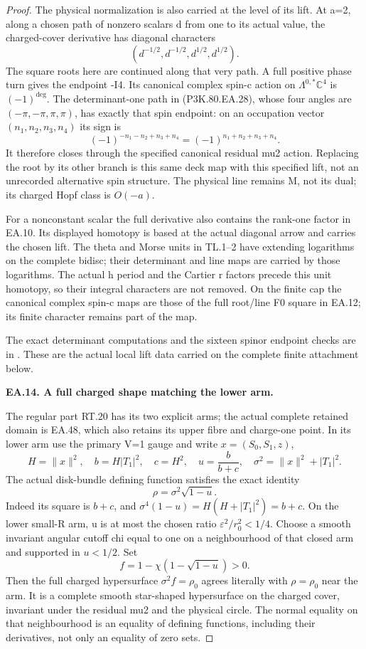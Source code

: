 \begin{proof}
The physical normalization is also carried at the level of its
lift. At a=2, along a chosen path of nonzero scalars d from one
to its actual value, the charged-cover derivative has diagonal
characters
\[
 (d^{-1/2},d^{-1/2},d^{1/2},d^{1/2}).
 \tag{P3K.80.EA.28}
\]
The square roots here are continued along that very path. A full
positive phase turn gives the endpoint -I4. Its canonical complex
spin-c action on \(\Lambda^{0,*}\mathbb C^4\) is
\((-1)^{\deg}\). The determinant-one path in (P3K.80.EA.28), whose
four angles are \((-\pi,-\pi,\pi,\pi)\), has exactly that
spin endpoint: on an occupation vector \((n_1,n_2,n_3,n_4)\)
its sign is
\[
 (-1)^{-n_1-n_2+n_3+n_4}=(-1)^{n_1+n_2+n_3+n_4}.
\]
It therefore closes through the specified canonical residual mu2
action. Replacing the root by its other branch is this same deck
map with this specified lift, not an unrecorded alternative spin
structure. The physical line remains M, not its dual; its charged
Hopf class is \(O(-a)\).

For a nonconstant scalar the full derivative also contains the
rank-one factor in EA.10. Its displayed homotopy is based at the
actual diagonal arrow and carries the chosen lift. The theta and
Morse units in TL.1--2 have extending logarithms on the complete
bidisc; their determinant and line maps are carried by those
logarithms. The actual h period and the Cartier r factors precede
this unit homotopy, so their integral characters are not removed.
On the finite cap the canonical complex spin-c maps are those of
the full root/line F0 square in EA.12; its finite character remains
part of the map.

The exact determinant computations and the sixteen spinor endpoint
checks are in .
These are the actual local lift data carried on the complete finite attachment below.

\par\medskip\noindent\textbf{EA.14. A full charged shape matching the lower arm.}\par\nopagebreak[4]

The regular part RT.20 has its two explicit arms; the actual complete retained domain is EA.48, which also retains its upper fibre and charge-one point. In its lower arm use the primary V=1 gauge and write
\(x=(S_0,S_1,z)\),
\[
 H=\|x\|^2,\quad b=H|T_1|^2,\quad c=H^2,
 \quad u=\frac b{b+c},\quad
 \sigma^2=\|x\|^2+|T_1|^2.
\]
The actual disk-bundle defining function satisfies the exact identity
\[
                  \rho=\sigma^2\sqrt{1-u}.
 \tag{P3K.80.EA.29}
\]
Indeed its square is \(b+c\), and
\(\sigma^4(1-u)=H(H+|T_1|^2)=b+c\).
On the lower small-R arm, u is at most the chosen ratio
\(\varepsilon^2/r_0^2<1/4\). Choose a smooth invariant angular
cutoff chi equal to one on a neighbourhood of that closed arm and
supported in \(u<1/2\). Set
\[
             f=1-\chi(1-\sqrt{1-u})>0.
\]
Then the full charged hypersurface \(\sigma^2f=\rho_0\)
agrees literally with \(\rho=\rho_0\) near the arm. It is a
complete smooth star-shaped hypersurface on the charged cover,
invariant under the residual mu2 and the physical circle. The
normal equality on that neighbourhood is an equality of defining
functions, including their derivatives, not only an equality of
zero sets.


\end{proof}
